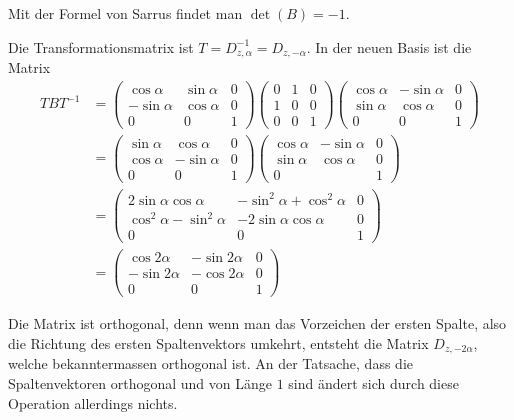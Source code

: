 \begin{loesung}
\begin{teilaufgaben}
\item Mit der Formel von Sarrus findet man $\det(B)=-1$.
\item
Die Transformationsmatrix ist $T=D_{z,\alpha}^{-1}=D_{z,-\alpha}$.
In der neuen Basis ist die Matrix
\begin{align*}
TBT^{-1}
&=
\begin{pmatrix}
 \cos\alpha& \sin\alpha&0\\
-\sin\alpha& \cos\alpha&0\\
 0         &0          &1
\end{pmatrix}
\begin{pmatrix}
0&1&0\\
1&0&0\\
0&0&1
\end{pmatrix}
\begin{pmatrix}
 \cos\alpha&-\sin\alpha&0\\
 \sin\alpha& \cos\alpha&0\\
 0         &0          &1
\end{pmatrix}
\\
&=
\begin{pmatrix}
 \sin\alpha& \cos\alpha&0\\
 \cos\alpha&-\sin\alpha&0\\
 0         &0          &1
\end{pmatrix}
\begin{pmatrix}
 \cos\alpha&-\sin\alpha&0\\
 \sin\alpha& \cos\alpha&0\\
 0         &           &1
\end{pmatrix}
\\
&=
\begin{pmatrix}
 2\sin\alpha\cos\alpha   &-\sin^2\alpha+\cos^2\alpha&0\\
\cos^2\alpha-\sin^2\alpha&-2\sin\alpha\cos\alpha    &0\\
 0                       &0                         &1
\end{pmatrix}
\\
&=
\begin{pmatrix}
 \cos2\alpha &-\sin2\alpha & 0\\
-\sin2\alpha &-\cos2\alpha & 0\\
      0      &      0      & 1
\end{pmatrix}
\end{align*}
\item
Die Matrix ist orthogonal, denn wenn man das Vorzeichen der
ersten Spalte, also die Richtung des ersten Spaltenvektors umkehrt,
entsteht die Matrix $D_{z,-2\alpha}$, welche bekanntermassen
orthogonal ist. An der Tatsache, dass die Spaltenvektoren orthogonal
und von Länge $1$ sind ändert sich durch diese Operation allerdings
nichts.


\end{teilaufgaben}
\end{loesung}
